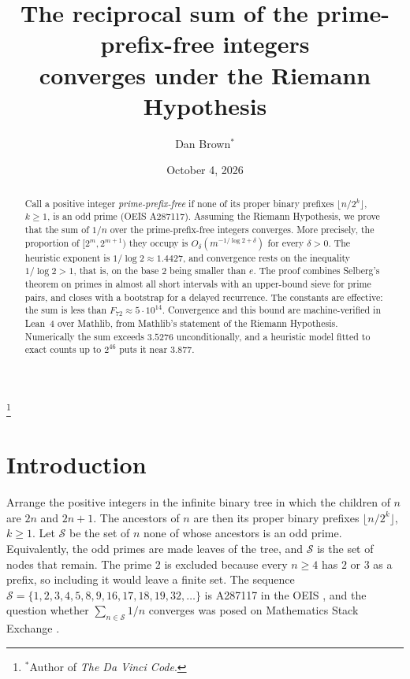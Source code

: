 \documentclass[11pt]{amsart}
\newcommand{\Sset}{\mathcal{S}}
\begin{document}
\title[Prime-prefix-free integers]{The reciprocal sum of the prime-prefix-free integers\\ converges under the Riemann Hypothesis}

\author{Dan Brown$^*$}
\thanks{$^*$Author of \emph{The Da Vinci Code}.}

\date{October 4, 2026}

\begin{abstract}
Call a positive integer \emph{prime-prefix-free} if none of its proper
binary prefixes $\lfloor n/2^k \rfloor$, $k \ge 1$, is an odd prime (OEIS
A287117). Assuming the Riemann Hypothesis, we prove that the sum of
$1/n$ over the prime-prefix-free integers converges. More precisely, the
proportion of $[2^m, 2^{m+1})$ they occupy is $O_\delta(m^{-1/\log 2 +
\delta})$ for every $\delta > 0$. The heuristic exponent is $1/\log 2
\approx 1.4427$, and convergence rests on the inequality $1/\log 2 > 1$,
that is, on the base $2$ being smaller than $e$. The proof combines
Selberg's theorem on primes in almost all short intervals with an
upper-bound sieve for prime pairs, and closes with a bootstrap for a
delayed recurrence. The constants are effective: the sum is less than
$F_{72} \approx 5 \cdot 10^{14}$. Convergence and this bound are
machine-verified in Lean~4 over Mathlib, from Mathlib's statement of the
Riemann Hypothesis. Numerically the sum exceeds $3.5276$
unconditionally, and a heuristic model fitted to exact counts up to
$2^{46}$ puts it near $3.877$.
\end{abstract}

\maketitle

\section{Introduction}

Arrange the positive integers in the infinite binary tree in which the
children of $n$ are $2n$ and $2n+1$. The ancestors of $n$ are then its
proper binary prefixes $\lfloor n/2^k \rfloor$, $k \ge 1$. Let $\Sset$ be
the set of $n$ none of whose ancestors is an odd prime. Equivalently, the
odd primes are made leaves of the tree, and $\Sset$ is the set of nodes
that remain. The prime $2$ is excluded because every $n \ge 4$ has
$2$ or $3$ as a prefix, so including it would leave a finite set. The
sequence $\Sset = \{1, 2, 3, 4, 5, 8, 9, 16, 17, 18, 19, 32, \dots\}$ is
A287117 in the OEIS \cite{OEIS}, and the question whether
$\sum_{n \in \Sset} 1/n$ converges was posed on Mathematics Stack
Exchange \cite{MSE}.
\end{document}
